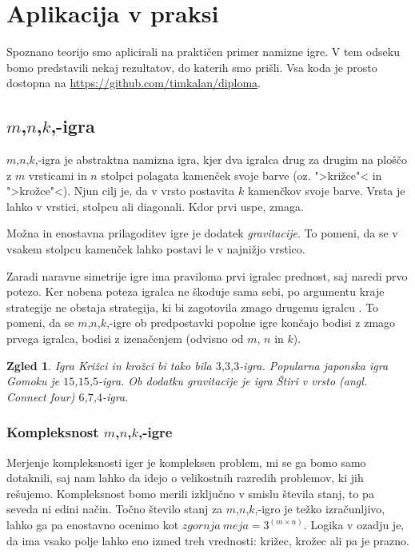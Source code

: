 \documentclass[12pt,a4paper]{amsart}
\theoremstyle{definition} %
\theoremstyle{plain} %
\newtheorem{zgled}[definicija]{Zgled}
\begin{document}
\section{Aplikacija v praksi}
Spoznano teorijo smo aplicirali na praktičen primer namizne igre. V tem odseku bomo predstavili 
nekaj rezultatov, do katerih smo prišli. Vsa koda je prosto dostopna na 
\href{https://github.com/timkalan/diploma}{https://github.com/timkalan/diploma}.

\subsection{$m$,$n$,$k$,-igra}
$m$,$n$,$k$,-igra je abstraktna namizna igra, kjer dva igralca drug za drugim na ploščo z $m$ 
vrsticami in $n$ stolpci polagata kamenček svoje barve (oz. ">križce"< in ">krožce"<). Njun cilj 
je, da v vrsto postavita $k$ kamenčkov svoje barve. Vrsta je lahko v vrstici, stolpcu ali diagonali.
Kdor prvi uspe, zmaga.

Možna in enostavna prilagoditev igre je dodatek \textit{gravitacije}. To pomeni, da se v vsakem
stolpcu kamenček lahko postavi le v najnižjo vrstico.

Zaradi naravne simetrije igre ima praviloma prvi igralec prednost, saj naredi prvo potezo. Ker nobena 
poteza igralca ne škoduje sama sebi, po argumentu kraje strategije ne obstaja strategija, ki bi 
zagotovila zmago drugemu igralcu \cite{SSA}. To pomeni, da se $m$,$n$,$k$,-igre ob predpostavki 
popolne igre končajo bodisi z zmago prvega igralca, bodisi z izenačenjem (odvisno od $m$, $n$ in $k$).

\begin{zgled}
    Igra Križci in krožci bi tako bila $3$,$3$,$3$-igra. Popularna japonska igra Gomoku je 
    $15$,$15$,$5$-igra. Ob dodatku gravitacije je igra Štiri v vrsto (angl. \textit{Connect four}) 
    $6$,$7$,$4$-igra.
\end{zgled}

\subsubsection{Kompleksnost $m$,$n$,$k$,-igre}
Merjenje kompleksnosti iger je kompleksen problem, mi se ga bomo samo dotaknili, saj nam lahko da idejo 
o velikostnih razredih problemov, ki jih rešujemo. Kompleksnost bomo merili izključno v smislu števila 
stanj, to pa seveda ni edini način. Točno število stanj za $m$,$n$,$k$,-igro je težko izračunljivo, lahko 
ga pa enostavno ocenimo kot $zgornja~meja = 3 ^ {(m \times n)}$. Logika v ozadju je, da ima vsako polje 
lahko eno izmed treh vrednosti: križec, krožec ali pa je prazno.
\end{document}
